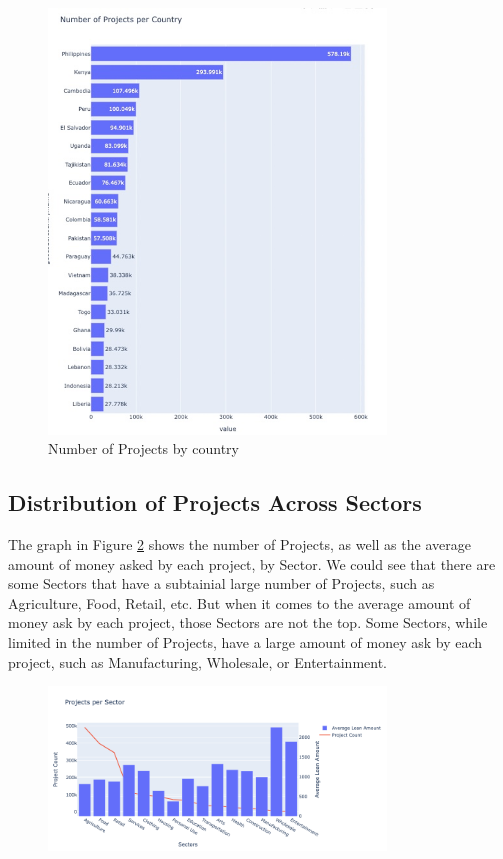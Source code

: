 \begin{figure}[H]
	\centering
	\includegraphics[width=0.8\textwidth]{images/country-project-distribution.png}
	\caption{Number of Projects by country}
	\label{fig:country-project-distribution}
\end{figure}


\subsection{Distribution of Projects Across Sectors}

The graph in Figure \ref{fig:project-vs-sector} shows the number of Projects,
as well as the average amount of money asked by each project, by Sector.
We could see that there are some Sectors that have a subtainial large number of Projects, such as Agriculture, Food, Retail, etc.
But when it comes to the average amount of money ask by each project, those Sectors are not the top.
Some Sectors, while limited in the number of Projects, have a large amount of money ask by each project, such as Manufacturing, Wholesale, or Entertainment.


\begin{figure}[H]
	\centering
	\includegraphics[width=0.8\textwidth]{images/project-vs-sector.png}
	\caption{}
	\label{fig:project-vs-sector}
\end{figure}

